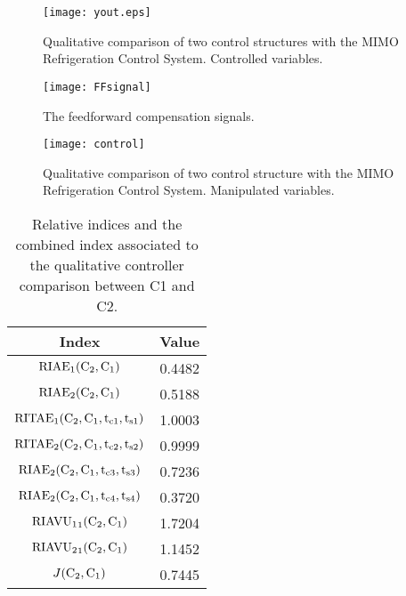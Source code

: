 \documentclass{ifacconf}
\begin{document}
\begin{figure}[htbp]
\begin{center}
\texttt{[image: yout.eps]}    %
\caption{Qualitative comparison of two control structures with the MIMO Refrigeration Control System. Controlled variables.}
\label{yout}
\end{center}
\end{figure}

\begin{figure}[htbp]
\begin{center}
\texttt{[image: FFsignal]}    %
\caption{The feedforward compensation signals.}
\label{FFsignal}
\end{center}
\end{figure}


\begin{figure}[htbp]
\begin{center}
\texttt{[image: control]}    %
\caption{Qualitative comparison of two control structure with the MIMO Refrigeration Control System. Manipulated variables. }
\label{control}
\end{center}
\end{figure}


\begin{table}[htb]
\begin{center}
\caption{Relative indices and the combined index associated to the qualitative controller
comparison between C1 and C2.}\label{index}
\begin{tabular}{cc}
Index & Value\\\hline
${\rm{RIAE}}_1({\rm{C_2,C_1}})$ & 0.4482 \\
${\rm{RIAE}}_2({\rm{C_2,C_1}})$ & 0.5188 \\
${\rm{RITAE}}_1({\rm{C_2,C_1,t_{c1},t_{s1}}})$ & 1.0003 \\
${\rm{RITAE}}_2({\rm{C_2,C_1,t_{c2},t_{s2}}})$ & 0.9999 \\
${\rm{RIAE}}_2({\rm{C_2,C_1,t_{c3},t_{s3}}})$ & 0.7236 \\
${\rm{RIAE}}_2({\rm{C_2,C_1,t_{c4},t_{s4}}})$ & 0.3720 \\
${\rm{RIAVU_1}}_1({\rm{C_2,C_1}})$ & 1.7204 \\
${\rm{RIAVU_2}}_1({\rm{C_2,C_1}})$ & 1.1452 \\ \hline
$J({\rm{C_2,C_1}})$ & 0.7445 \\ \hline
\end{tabular}
\end{center}
\end{table}
\end{document}
